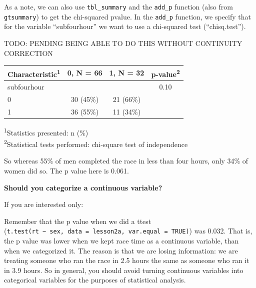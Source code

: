 \documentclass[]{book}
\newenvironment{Shaded}{\begin{snugshade}}{\end{snugshade}}
\newcommand{\DataTypeTok}[1]{\textcolor[rgb]{0.13,0.29,0.53}{#1}}
\newcommand{\KeywordTok}[1]{\textcolor[rgb]{0.13,0.29,0.53}{\textbf{#1}}}
\newcommand{\NormalTok}[1]{#1}
\newcommand{\OperatorTok}[1]{\textcolor[rgb]{0.81,0.36,0.00}{\textbf{#1}}}
\newcommand{\StringTok}[1]{\textcolor[rgb]{0.31,0.60,0.02}{#1}}
\begin{document}
As a note, we can also use \texttt{tbl\_summary} and the \texttt{add\_p}
function (also from \texttt{gtsummary}) to get the chi-squared pvalue.
In the \texttt{add\_p} function, we specify that for the variable
``subfourhour'' we want to use a chi-squared test (``chisq.test'').

TODO: PENDING BEING ABLE TO DO THIS WITHOUT CONTINUITY CORRECTION

\begin{Shaded}
\end{Shaded}

\captionsetup[table]{labelformat=empty,skip=1pt}
\begin{longtable}{lccc}
\toprule
\textbf{Characteristic}\textsuperscript{1} & \textbf{0}, N = 66 & \textbf{1}, N = 32 & \textbf{p-value}\textsuperscript{2} \\ 
\midrule
subfourhour &  &  & 0.10 \\ 
0 & 30 (45\%) & 21 (66\%) &  \\ 
1 & 36 (55\%) & 11 (34\%) &  \\ 
\bottomrule
\end{longtable}
\vspace{-5mm}
\begin{minipage}{\linewidth}
\textsuperscript{1}Statistics presented: n (\%) \\ 
\textsuperscript{2}Statistical tests performed: chi-square test of independence \\ 
\end{minipage}

So whereas 55\% of men completed the race in less than four hours, only
34\% of women did so. The p value here is 0.061.

\textbf{Should you categorize a continuous variable?}

If you are interested only:

Remember that the p value when we did a ttest
(\texttt{t.test(rt\ \textasciitilde{}\ sex,\ data\ =\ lesson2a,\ var.equal\ =\ TRUE)})
was 0.032. That is, the p value was lower when we kept race time as a
continuous variable, than when we categorized it. The reason is that we
are losing information: we are treating someone who ran the race in 2.5
hours the same as someone who ran it in 3.9 hours. So in general, you
should avoid turning continuous variables into categorical variables for
the purposes of statistical analysis.
\end{document}
